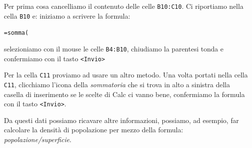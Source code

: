 Per prima cosa cancelliamo il contenuto delle celle \texttt{B10:C10}.
Ci riportiamo nella cella \texttt{B10} e: iniziamo a scrivere la formula:

\texttt{=somma(}

selezioniamo con il mouse le celle \texttt{B4:B10},
chiudiamo la parentesi tonda e confermiamo con il tasto 
\texttt{\textless{}Invio\textgreater{}}

Per la cella \texttt{C11} proviamo ad usare un altro metodo.
Una volta portati nella cella \texttt{C11}, clicchiamo l'icona della 
\emph{sommatoria}
che si trova in alto a sinistra della casella di inserimento se le scelte
di Calc ci vanno bene, confermiamo la formula con il tasto 
\texttt{\textless{}Invio\textgreater{}}.

\salvare

Da questi dati possiamo ricavare altre informazioni, 
possiamo, ad esempio, far calcolare la densità di popolazione per mezzo
della formula: \emph{popolazione/superficie}.


